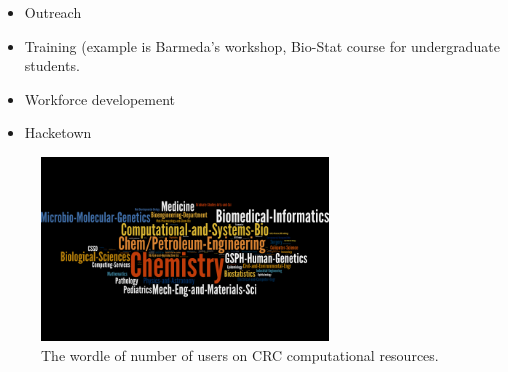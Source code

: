 \documentclass[conference]{IEEEtran}
\begin{document}
\begin{itemize}
\item Outreach
\item Training (example is Barmeda's workshop, Bio-Stat course for undergraduate students.
\item Workforce developement
\item Hacketown
\end{itemize}



\begin{figure}
    \centering
    \includegraphics[width=3in]{wordle1}
    \caption{The wordle of number of users on CRC computational resources.}
    \label{fig:wordle1}
\end{figure}
\end{document}
